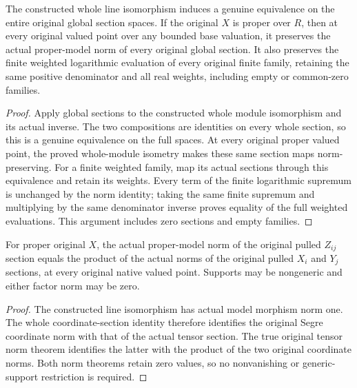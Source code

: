 \begin{theorem}
\label{thm:original-segre-whole-sections-model-isometry}
\leanok
{}
The constructed whole line isomorphism induces a genuine equivalence on
the entire original global section spaces. If the original $X$ is proper
over $R$, then at every original valued point over any bounded base
valuation, it preserves the actual proper-model norm of every original
global section. It also preserves the finite weighted logarithmic
evaluation of every original finite family, retaining the same positive
denominator and all real weights, including empty or common-zero families.
\end{theorem}
\begin{proof}
Apply global sections to the constructed whole module isomorphism and
its actual inverse. The two compositions are identities on every whole
section, so this is a genuine equivalence on the full spaces. At every
original proper valued point, the proved whole-module isometry makes
these same section maps norm-preserving. For a finite weighted family,
map its actual sections through this equivalence and retain its weights.
Every term of the finite logarithmic supremum is unchanged by the norm
identity; taking the same finite supremum and multiplying by the same
denominator inverse proves equality of the full weighted evaluations.
This argument includes zero sections and empty families.
\end{proof}

\begin{theorem}
\label{thm:original-segre-coordinate-model-norm}
\leanok
{}
For proper original $X$, the actual proper-model norm of the original
pulled $Z_{ij}$ section equals the product of the actual norms of the
original pulled $X_i$ and $Y_j$ sections, at every original native valued
point. Supports may be nongeneric and either factor norm may be zero.
\end{theorem}
\begin{proof}
The constructed line isomorphism has actual model morphism norm one.
The whole coordinate-section identity therefore identifies the original
Segre coordinate norm with that of the actual tensor section. The true
original tensor norm theorem identifies the latter with the product of
the two original coordinate norms. Both norm theorems retain zero values,
so no nonvanishing or generic-support restriction is required.
\end{proof}
